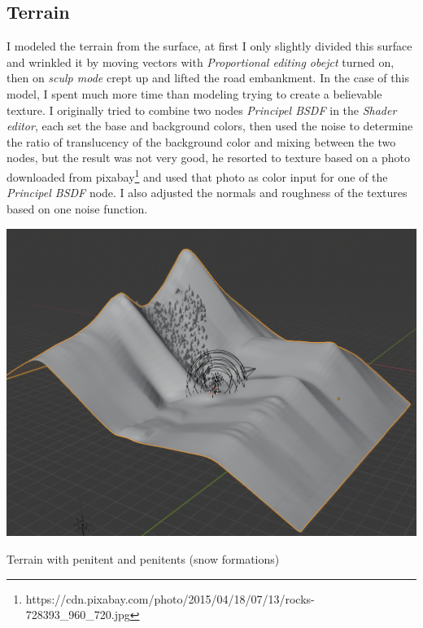 \documentclass[12pt,a4paper,titlepage,final,tikz,border=4mm]{report}
\begin{document}
\subsection{Terrain}
I modeled the terrain from the surface, at first I only slightly divided this surface and wrinkled it by moving vectors with \textit{Proportional editing obejct} turned on, then on \textit{sculp mode} crept up and lifted the road embankment. In the case of this model, I spent much more time than modeling trying to create a believable texture. I originally tried to combine two nodes \textit{Principel BSDF} in the \textit{Shader editor}, each set the base and background colors, then used the noise to determine the ratio of translucency of the background color and mixing between the two nodes, but the result was not very good, he resorted to texture based on a photo downloaded from pixabay\footnote{https://cdn.pixabay.com/photo/2015/04/18/07/13/rocks-728393_960_720.jpg} and used that photo as color input for one of the \textit{Principel BSDF} node. I also adjusted the normals and roughness of the textures based on one noise function.
\begin {center}
\includegraphics [height = 10cm] {terrain.png}
\caption {Terrain with penitent and penitents (snow formations)}
\end {center}
\end{document}
